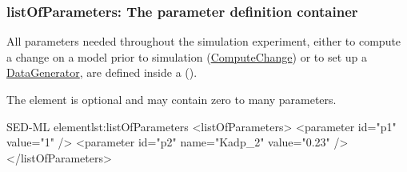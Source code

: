   \subsubsection{listOfParameters: The parameter definition container}
\label{sec:listOfParameters}
All parameters needed throughout the simulation experiment, either to compute a change on a model prior to simulation (\hyperref[class:computeChange]{ComputeChange}) or to set up a \hyperref[class:dataGenerator]{DataGenerator},  are defined inside a  ().
%

The element is optional and may contain zero to many parameters.
%
\begin{myXmlLst}{SED-ML  element}{lst:listOfParameters}
<listOfParameters>
 <parameter id="p1" value="1" />
 <parameter id="p2" name="Kadp_2" value="0.23" />
</listOfParameters>
\end{myXmlLst}
%


